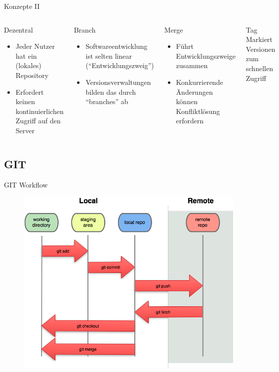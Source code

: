\documentclass[18pt]{beamer}
\begin{document}
\begin{frame}{Konzepte II}
\begin{columns}
			\begin{block}{Dezentral}
				\begin{itemize}
					\item Jeder Nutzer hat ein (lokales) Repository \\
					\item Erfordert keinen kontinuierlichen Zugriff auf den Server
				\end{itemize}
			\end{block}
			\begin{block}{Branch}
				\begin{itemize}
					\item Softwareentwicklung ist selten linear (\enquote{Entwicklungszweig})
					\item Versionsverwaltungen bilden das durch \enquote{branches} ab
				\end{itemize}
			\end{block}
			\begin{block}{Merge}
				\begin{itemize}
					\item Führt Entwicklungszweige zusammen
					\item Konkurrierende Änderungen können Konfliktlösung erfordern
				\end{itemize}
			\end{block}
			\begin{block}{Tag}
				Markiert Versionen zum schnellen Zugriff
			\end{block}
\end{columns}
\end{frame}

\subsection{GIT}
\begin{frame}{GIT Workflow}
	\begin{figure}
		\includegraphics[width=0.75\linewidth]{images/local-remote.png}
	\end{figure}
\end{frame}
\end{document}
